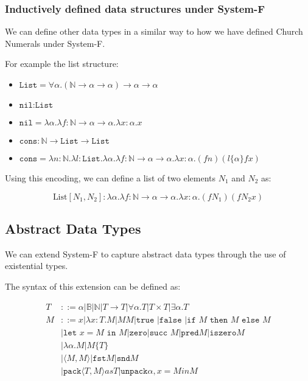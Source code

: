 \documentclass{article}
\newcommand{\B}{\mathbb{B}}
\newcommand{\N}{\mathbb{N}}
\newcommand{\T}{\texttt{true }}
\newcommand{\F}{\texttt{false }}
\renewcommand{\succ}{\texttt{succ }}
\newcommand{\rarr}{\rightarrow}
\begin{document}
\subsubsection{Inductively defined data structures under System-F}

We can define other data types in a similar way to how we have defined Church Numerals under System-F.

For example the list structure: 
\begin{itemize}
    \item $ \texttt{List} = \forall \alpha. ( \N \rarr \alpha \rarr \alpha) \rarr \alpha \rarr \alpha $
    \item $ \texttt{nil} : \texttt{List}$
    \item $ \texttt{nil} = \lambda \alpha. \lambda f: \N \rarr \alpha \rarr \alpha . \lambda x: \alpha .x$
    \item $ \texttt{cons} : \N \rarr \texttt{List} \rarr \texttt{List}$
    \item $\texttt{cons} = \lambda n: \N. \lambda l: \texttt{List}. \lambda \alpha. \lambda f: \N \rarr \alpha \rarr \alpha . \lambda x: \alpha. (f n)(l \{ \alpha  \} f x)$
\end{itemize}

Using this encoding, we can define a list of two elements $N_1$ and $N_2$ as:

$$
\text{List}[N_1,N_2]: \lambda \alpha. \lambda f: \N \rarr \alpha \rarr \alpha . \lambda x: \alpha. (f N_1) (f N_2 x)
$$

\subsection{Abstract Data Types}

We can extend System-F to capture abstract data types through the use of existential types.

The syntax of this extension can be defined as:

\begin{align*}
    T &::= \alpha | \B | \N | T \rarr T | \forall \alpha. T | T \times T | \exists \alpha. T \\
    M &::= x | \lambda x:T.M | M M | \T | \F | \texttt{if } M \texttt{ then } M \texttt{ else }  M \\
      & |\texttt{let } x = M \texttt{ in } M | \texttt{zero} | \succ M | \texttt{pred} M | \texttt{iszero} M \\ 
      & | \lambda \alpha .M | M \{ T \} \\
      & | \langle M,M \rangle | \texttt{fst} M | \texttt{snd} M \\
      & | \texttt{pack} \langle T,M \rangle  as T | \texttt{unpack} \alpha, x = M in M 
\end{align*}
\end{document}
